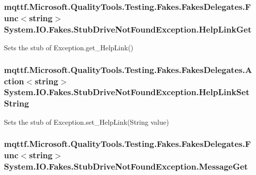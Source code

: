\hypertarget{class_system_1_1_i_o_1_1_fakes_1_1_stub_drive_not_found_exception_a8a713090d885890c351a41eedf31c9ed}{
\subsubsection[{Help\-Link\-Get}]{\setlength{\rightskip}{0pt plus 5cm}mqttf.\-Microsoft.\-Quality\-Tools.\-Testing.\-Fakes.\-Fakes\-Delegates.\-Func$<$string$>$ System.\-I\-O.\-Fakes.\-Stub\-Drive\-Not\-Found\-Exception.\-Help\-Link\-Get}}\label{class_system_1_1_i_o_1_1_fakes_1_1_stub_drive_not_found_exception_a8a713090d885890c351a41eedf31c9ed}


Sets the stub of Exception.\-get\-\_\-\-Help\-Link()

\hypertarget{class_system_1_1_i_o_1_1_fakes_1_1_stub_drive_not_found_exception_a7839d88a6ef8afaaa98475fb16a10bd9}{
\subsubsection[{Help\-Link\-Set\-String}]{\setlength{\rightskip}{0pt plus 5cm}mqttf.\-Microsoft.\-Quality\-Tools.\-Testing.\-Fakes.\-Fakes\-Delegates.\-Action$<$string$>$ System.\-I\-O.\-Fakes.\-Stub\-Drive\-Not\-Found\-Exception.\-Help\-Link\-Set\-String}}\label{class_system_1_1_i_o_1_1_fakes_1_1_stub_drive_not_found_exception_a7839d88a6ef8afaaa98475fb16a10bd9}


Sets the stub of Exception.\-set\-\_\-\-Help\-Link(\-String value)

\hypertarget{class_system_1_1_i_o_1_1_fakes_1_1_stub_drive_not_found_exception_a9de1949f026530863b1e1fc6dcfe7241}{
\subsubsection[{Message\-Get}]{\setlength{\rightskip}{0pt plus 5cm}mqttf.\-Microsoft.\-Quality\-Tools.\-Testing.\-Fakes.\-Fakes\-Delegates.\-Func$<$string$>$ System.\-I\-O.\-Fakes.\-Stub\-Drive\-Not\-Found\-Exception.\-Message\-Get}}\label{class_system_1_1_i_o_1_1_fakes_1_1_stub_drive_not_found_exception_a9de1949f026530863b1e1fc6dcfe7241}


